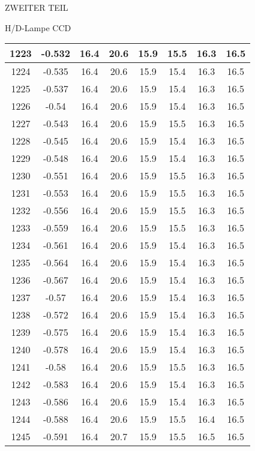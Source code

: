\begin{appendix}
\begin{chapter}{ZWEITER TEIL}
\begin{section}{H/D-Lampe CCD}
\begin{scriptsize}
\begin{longtable}[htbp]{|c|c|c|c|c|c|c|c|}
            1223 & -0.532 & 16.4 & 20.6 & 15.9 & 15.5 & 16.3 & 16.5 \\ \hline
            1224 & -0.535 & 16.4 & 20.6 & 15.9 & 15.4 & 16.3 & 16.5 \\ \hline
            1225 & -0.537 & 16.4 & 20.6 & 15.9 & 15.4 & 16.3 & 16.5 \\ \hline
            1226 & -0.54 & 16.4 & 20.6 & 15.9 & 15.4 & 16.3 & 16.5 \\ \hline
            1227 & -0.543 & 16.4 & 20.6 & 15.9 & 15.5 & 16.3 & 16.5 \\ \hline
            1228 & -0.545 & 16.4 & 20.6 & 15.9 & 15.4 & 16.3 & 16.5 \\ \hline
            1229 & -0.548 & 16.4 & 20.6 & 15.9 & 15.4 & 16.3 & 16.5 \\ \hline
            1230 & -0.551 & 16.4 & 20.6 & 15.9 & 15.5 & 16.3 & 16.5 \\ \hline
            1231 & -0.553 & 16.4 & 20.6 & 15.9 & 15.5 & 16.3 & 16.5 \\ \hline
            1232 & -0.556 & 16.4 & 20.6 & 15.9 & 15.5 & 16.3 & 16.5 \\ \hline
            1233 & -0.559 & 16.4 & 20.6 & 15.9 & 15.5 & 16.3 & 16.5 \\ \hline
            1234 & -0.561 & 16.4 & 20.6 & 15.9 & 15.4 & 16.3 & 16.5 \\ \hline
            1235 & -0.564 & 16.4 & 20.6 & 15.9 & 15.4 & 16.3 & 16.5 \\ \hline
            1236 & -0.567 & 16.4 & 20.6 & 15.9 & 15.4 & 16.3 & 16.5 \\ \hline
            1237 & -0.57 & 16.4 & 20.6 & 15.9 & 15.4 & 16.3 & 16.5 \\ \hline
            1238 & -0.572 & 16.4 & 20.6 & 15.9 & 15.4 & 16.3 & 16.5 \\ \hline
            1239 & -0.575 & 16.4 & 20.6 & 15.9 & 15.4 & 16.3 & 16.5 \\ \hline
            1240 & -0.578 & 16.4 & 20.6 & 15.9 & 15.4 & 16.3 & 16.5 \\ \hline
            1241 & -0.58 & 16.4 & 20.6 & 15.9 & 15.5 & 16.3 & 16.5 \\ \hline
            1242 & -0.583 & 16.4 & 20.6 & 15.9 & 15.4 & 16.3 & 16.5 \\ \hline
            1243 & -0.586 & 16.4 & 20.6 & 15.9 & 15.4 & 16.3 & 16.5 \\ \hline
            1244 & -0.588 & 16.4 & 20.6 & 15.9 & 15.5 & 16.4 & 16.5 \\ \hline
            1245 & -0.591 & 16.4 & 20.7 & 15.9 & 15.5 & 16.5 & 16.5 \\ \hline

\end{longtable}
\end{scriptsize}
\end{section}
\end{chapter}
\end{appendix}
